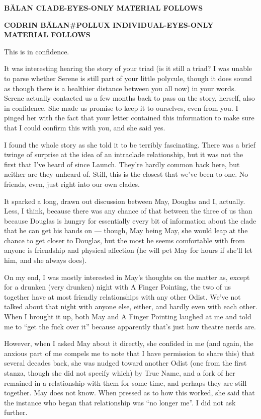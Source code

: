 \textbf{BĂLAN CLADE-EYES-ONLY MATERIAL FOLLOWS}

\textbf{CODRIN BĂLAN\#POLLUX INDIVIDUAL-EYES-ONLY MATERIAL FOLLOWS}

This is in confidence.

It was interesting hearing the story of your triad (is it still a triad? I was unable to parse whether Serene is still part of your little polycule, though it does sound as though there is a healthier distance between you all now) in your words. Serene actually contacted us a few months back to pass on the story, herself, also in confidence. She made us promise to keep it to ourselves, even from you. I pinged her with the fact that your letter contained this information to make sure that I could confirm this with you, and she said yes.

I found the whole story as she told it to be terribly fascinating. There was a brief twinge of surprise at the idea of an intraclade relationship, but it was not the first that I've heard of since Launch. They're hardly common back here, but neither are they unheard of. Still, this is the closest that we've been to one. No friends, even, just right into our own clades.

It sparked a long, drawn out discussion between May, Douglas and I, actually. Less, I think, because there was any chance of that between the three of us than because Douglas is hungry for essentially every bit of information about the clade that he can get his hands on — though, May being May, she would leap at the chance to get closer to Douglas, but the most he seems comfortable with from anyone is friendship and physical affection (he will pet May for hours if she'll let him, and she always does).

On my end, I was mostly interested in May's thoughts on the matter as, except for a drunken (very drunken) night with A Finger Pointing, the two of us together have at most friendly relationships with any other Odist. We've not talked about that night with anyone else, either, and hardly even with each other. When I brought it up, both May and A Finger Pointing laughed at me and told me to ``get the fuck over it'' because apparently that's just how theatre nerds are.

However, when I asked May about it directly, she confided in me (and again, the anxious part of me compels me to note that I have permission to share this) that several decades back, she was nudged toward another Odist (one from the first stanza, though she did not specify which) by True Name, and a fork of her remained in a relationship with them for some time, and perhaps they are still together. May does not know. When pressed as to how this worked, she said that the instance who began that relationship was ``no longer me''. I did not ask further.

